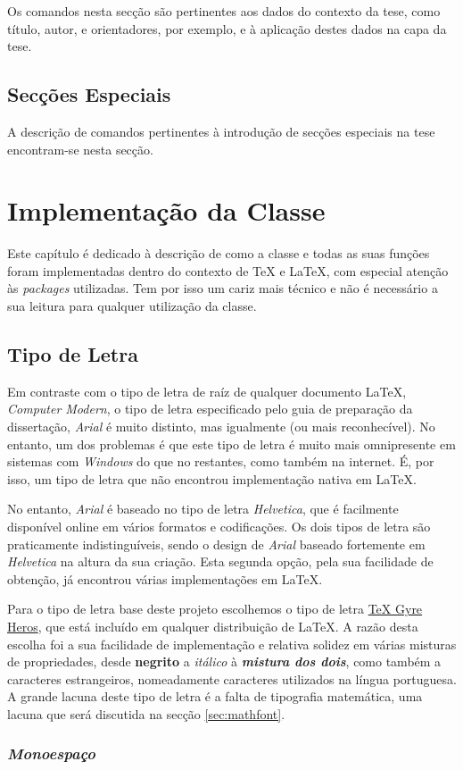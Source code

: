 \documentclass{../ist-thesis}
\begin{document}
Os comandos nesta secção são pertinentes aos dados do contexto da tese, como título, autor, e orientadores, por exemplo, e à aplicação destes dados na capa da tese.

\section{Secções Especiais}\label{sec:spec}

A descrição de comandos pertinentes à introdução de secções especiais na tese encontram-se nesta secção.

\chapter{Implementação da Classe}

Este capítulo é dedicado à descrição de como a classe e todas as suas funções foram implementadas dentro do contexto de \TeX{} e \LaTeX{}, com especial atenção às \textit{packages} utilizadas. Tem por isso um cariz mais técnico e não é necessário a sua leitura para qualquer utilização da classe.

\section{Tipo de Letra}

Em contraste com o tipo de letra de raíz de qualquer documento \LaTeX{}\footnotemark{}, \textit{Computer Modern}, o tipo de letra especificado pelo guia de preparação da dissertação, \textit{Arial} é muito distinto, mas igualmente (ou mais reconhecível). No entanto, um dos problemas é que este tipo de letra é muito mais omnipresente em sistemas com \textit{Windows} do que no restantes, como também na internet. É, por isso, um tipo de letra que não encontrou implementação nativa em \LaTeX{}.

No entanto, \textit{Arial} é baseado no tipo de letra \textit{Helvetica}, que é facilmente disponível online em vários formatos e codificações. Os dois tipos de letra são praticamente indistinguíveis, sendo o design de \textit{Arial} baseado fortemente em \textit{Helvetica} na altura da sua criação. Esta segunda opção, pela sua facilidade de obtenção, já encontrou várias implementações em \LaTeX{}.

Para o tipo de letra base deste projeto escolhemos o tipo de letra \href{https://ctan.org/pkg/tex-gyre-heros}{\TeX{} Gyre Heros}, que está incluído em qualquer distribuição de \LaTeX{}. A razão desta escolha foi a sua facilidade de implementação e relativa solidez em várias misturas de propriedades, desde \textbf{negrito} a \textit{itálico} à {\bfseries\itshape mistura dos dois}, como também a caracteres estrangeiros, nomeadamente caracteres utilizados na língua portuguesa. A grande lacuna deste tipo de letra é a falta de tipografia matemática, uma lacuna que será discutida na secção \ref{sec:mathfont}.

\subsection{\textit{Monoespaço}}
\end{document}

